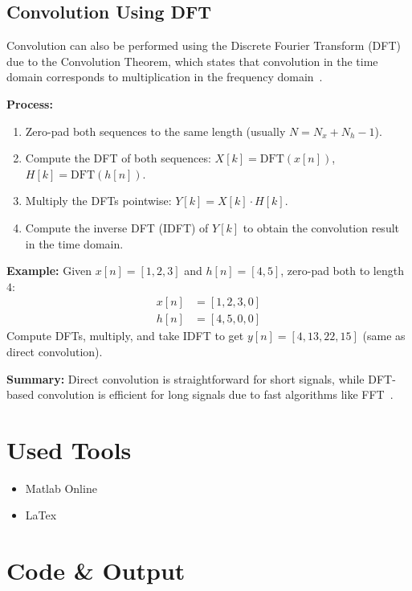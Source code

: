 \documentclass[11pt]{article}
\begin{document}
\subsection*{Convolution Using DFT}
Convolution can also be performed using the Discrete Fourier Transform (DFT) due to the Convolution Theorem, which states that convolution in the time domain corresponds to multiplication in the frequency domain~\cite{proakis2007digital}.

\textbf{Process:}
\begin{enumerate}
    \item Zero-pad both sequences to the same length (usually $N = N_x + N_h - 1$).
    \item Compute the DFT of both sequences: $X[k] = \text{DFT}(x[n])$, $H[k] = \text{DFT}(h[n])$.
    \item Multiply the DFTs pointwise: $Y[k] = X[k] \cdot H[k]$.
    \item Compute the inverse DFT (IDFT) of $Y[k]$ to obtain the convolution result in the time domain.
\end{enumerate}

\textbf{Example:}
Given $x[n] = [1, 2, 3]$ and $h[n] = [4, 5]$, zero-pad both to length $4$:
\begin{align*}
    x[n] & = [1, 2, 3, 0] \\
    h[n] & = [4, 5, 0, 0]
\end{align*}
Compute DFTs, multiply, and take IDFT to get $y[n] = [4, 13, 22, 15]$ (same as direct convolution).


\textbf{Summary:} Direct convolution is straightforward for short signals, while DFT-based convolution is efficient for long signals due to fast algorithms like FFT~\cite{oppenheim1999discrete,proakis2007digital}.

\section*{Used Tools}
\begin{itemize}
    \item Matlab Online
    \item LaTex
\end{itemize}

\section*{Code \& Output}
\end{document}
